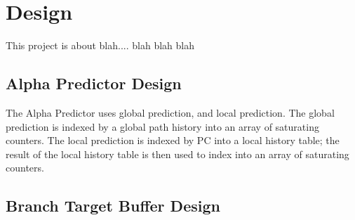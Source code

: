 \section{Design}
This project is about blah.... blah blah blah

\subsection{Alpha Predictor Design}
The Alpha Predictor uses global prediction, and local prediction. The global prediction is indexed by a global path history into an array of saturating counters. The local prediction is indexed by PC into a local history table; the result of the local history table is then used to index into an array of saturating counters.

\subsection{Branch Target Buffer Design}
